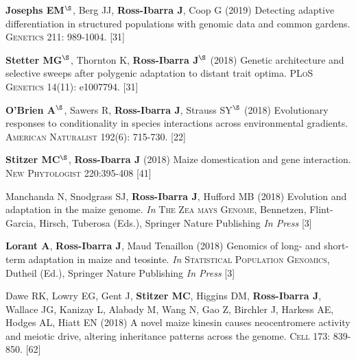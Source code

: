 \documentclass[letterpaper,10pt]{article}
\begin{document}
\begin{etaremune}
\item \textbf{Josephs EM}$^\S$, Berg JJ, \textbf{Ross-Ibarra J}, Coop G (2019) Detecting adaptive differentiation in structured populations with genomic data and common gardens. \textsc{Genetics} 211: 989-1004.
 [31]\\

\item \textbf{Stetter MG}$^\S$, Thornton K, \textbf{Ross-Ibarra J}$^\S$ (2018) Genetic architecture and selective sweeps after polygenic adaptation to distant trait optima. \textsc{PLoS Genetics} 14(11): e1007794. %
 [31]\\

\item \textbf{O'Brien A}$^\S$, Sawers R, \textbf{Ross-Ibarra J}, Strauss  SY$^\S$ (2018) Evolutionary responses to conditionality in species interactions across environmental gradients. \textsc{American Naturalist} 192(6): 715-730.
 [22]\\

\item \textbf{Stitzer MC}$^\S$, \textbf{Ross-Ibarra J} (2018) Maize domestication and gene interaction. \textsc{New Phytologist} 220:395-408
 [41]\\

\item Manchanda N, Snodgrass SJ, \textbf{Ross-Ibarra J}, Hufford MB (2018) Evolution and adaptation in the maize genome. \textit{In} \textsc{The Zea mays Genome}, Bennetzen, Flint-Garcia, Hirsch, Tuberosa (Eds.), Springer Nature Publishing \textit{In Press}
 [3]\\

\item \textbf{Lorant A}, \textbf{Ross-Ibarra J}, Maud Tenaillon (2018) Genomics of long- and short- term adaptation in maize and teosinte. \textit{In} \textsc{Statistical Population Genomics},  Dutheil (Ed.), Springer Nature Publishing \textit{In Press}
 [3]\\

\item Dawe RK, Lowry EG, Gent J, \textbf{Stitzer MC}, Higgins DM, \textbf{Ross-Ibarra J}, Wallace JG, Kanizay L, Alabady M, Wang N, Gao Z, Birchler J, Harkess AE, Hodges AL, Hiatt EN (2018) A novel maize kinesin causes neocentromere activity and meiotic drive, altering inheritance patterns across the genome. \textsc{Cell} 173: 839-850.
 [62]\\


\end{etaremune}
\end{document}
